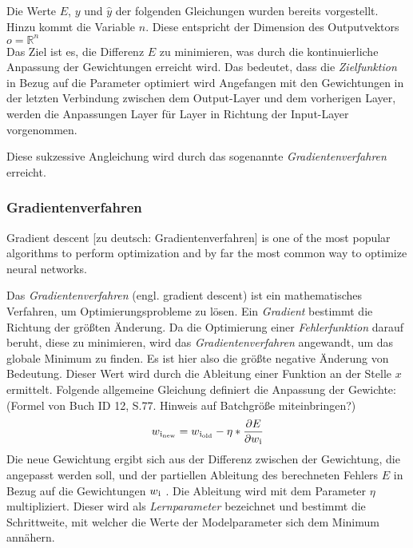Die Werte $E$, $y$ und $\hat{y}$ der folgenden Gleichungen wurden bereits vorgestellt. Hinzu kommt die Variable $n$. Diese entspricht der Dimension des Outputvektors $o = \mathbb{R}^n$
\\

Das Ziel ist es, die Differenz $E$ zu minimieren, was durch die kontinuierliche Anpassung der Gewichtungen erreicht wird. Das bedeutet, dass die \textit{Zielfunktion} \glqq in Bezug auf die Parameter\grqq{} \cite[S. 185]{14} optimiert wird \cite[vgl.][]{21} \cite[vgl.][S. 76]{12}
\glqq Angefangen mit den Gewichtungen in der letzten Verbindung zwischen dem Output-Layer und dem vorherigen Layer, werden die Anpassungen Layer für Layer in Richtung der Input-Layer vorgenommen.\grqq{} \cite[S. 78]{12}

Diese sukzessive Angleichung wird durch das sogenannte \textit{Gradientenverfahren} erreicht.

\subsubsection{Gradientenverfahren}
\glqq Gradient descent [zu deutsch: Gradientenverfahren] is one of the most popular algorithms to perform optimization and by far the most common way to optimize neural networks.\grqq{} \cite{21}

Das \textit{Gradientenverfahren} (engl. gradient descent) ist ein mathematisches Verfahren, um Optimierungsprobleme zu lösen. Ein \textit{Gradient} bestimmt die Richtung der größten Änderung. Da die Optimierung einer \textit{Fehlerfunktion} darauf beruht, diese zu minimieren, wird das \textit{Gradientenverfahren} angewandt, um das globale Minimum zu finden. Es ist hier also die größte negative Änderung von Bedeutung. Dieser Wert wird durch die Ableitung einer Funktion an der Stelle $x$ ermittelt. Folgende allgemeine Gleichung definiert die Anpassung der Gewichte: (Formel von Buch ID 12, S.77. Hinweis auf Batchgröße miteinbringen?)
\begin{equation} 
	w\textsubscript{i\textsubscript{new}} = w\textsubscript{i\textsubscript{old}} - \eta * \frac{\partial E}{\partial w\textsubscript{i}}
\end{equation}
\glqq Die neue Gewichtung ergibt sich aus der Differenz zwischen der Gewichtung, die angepasst werden soll, und der partiellen Ableitung des berechneten Fehlers $E$ in Bezug auf die Gewichtungen $w\textsubscript{i}$\grqq{} \cite[S. 77]{12}. Die Ableitung wird mit dem Parameter $\eta$ multipliziert. Dieser wird als \textit{Lernparameter} bezeichnet und bestimmt die Schrittweite, mit welcher die Werte der Modelparameter sich dem Minimum annähern.
\cite[vgl.][]{21} \\

